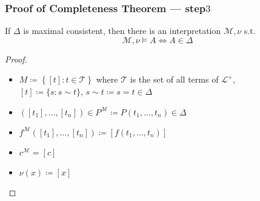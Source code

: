 \documentclass[UTF8,aspectratio=43,11pt,colorlinks,compress,openany]{beamer}%
\begin{document}
\begin{frame}\frametitle{Proof of Completeness Theorem --- step$3$}
	\begin{lemma}
		If $\Delta$ is maximal consistent, then there is an interpretation $\mathcal{M},\nu$ s.t.
		\[\mathcal{M},\nu\vDash A\iff A\in\Delta\]
	\end{lemma}
	\begin{proof}
		\begin{itemize}
			\item $M\coloneqq \left\{[t]: t\in\mathcal{T}\right\}$ where $\mathcal{T}$ is the set of all terms of $\mathscr{L}^+$,\\
			$[t]\coloneqq \{s: s\sim t\}$, $s\sim t\coloneqq s=t\in\Delta$
			\item $\left([t_1],\dots,[t_n]\right)\in P^{\mathcal{M}}\coloneqq P\left(t_1,\dots,t_n\right)\in\Delta$
			\item $f^{\mathcal{M}}\left([t_1],\dots,[t_n]\right)\coloneqq [f(t_1,\dots,t_n)]$
			\item $c^{\mathcal{M}}=[c]$
			\item $\nu(x)\coloneqq [x]$
		\end{itemize}
	\end{proof}
\end{frame}
\end{document}
